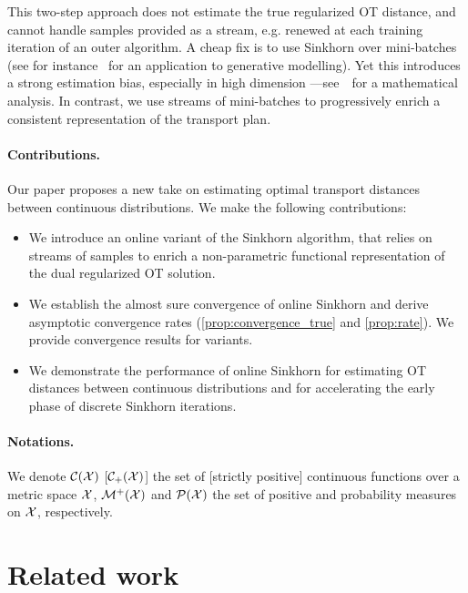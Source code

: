 This two-step approach does not estimate the true regularized OT
distance, and cannot handle samples provided as a stream, e.g. renewed at each
training iteration of an outer algorithm. A cheap fix is to use Sinkhorn over
mini-batches (see for instance~\citet{2018-Genevay-aistats} for an application
to generative modelling). Yet this introduces a strong estimation bias, especially in high
dimension ---see~\citet{fatras2019learning} for a mathematical analysis. In
contrast, we use streams of mini-batches to progressively enrich a consistent representation of the
transport plan.

\paragraph{Contributions.} Our paper proposes a new take on estimating optimal transport distances between continuous distributions. We make the following contributions:
\begin{itemize}[topsep=0pt, partopsep=0pt]
    \item We introduce an online variant of the Sinkhorn algorithm, that relies on
    streams of samples to enrich a non-parametric
    functional representation of the dual regularized OT solution.
    \item We establish the almost sure convergence of online Sinkhorn and derive asymptotic convergence rates 
    (\autoref{prop:convergence_true} and \ref{prop:rate}). We provide
    convergence results for variants.
    \item We demonstrate the performance of online Sinkhorn for estimating OT
    distances between continuous distributions and for accelerating the early
    phase of discrete Sinkhorn iterations.
\end{itemize}
% 
\paragraph{Notations.} We denote $\mathcal{C}(\mathcal{X})$ [$\mathcal{C}_+(\mathcal{X})$] the set of [strictly
positive] continuous functions over a metric space $\mathcal{X}$, $\mathcal{M}^+(\mathcal{X})$ and
$\mathcal{P}(\mathcal{X})$ the set of positive and probability measures on $\mathcal{X}$, respectively.

\section{Related work}\label{sec:related}

